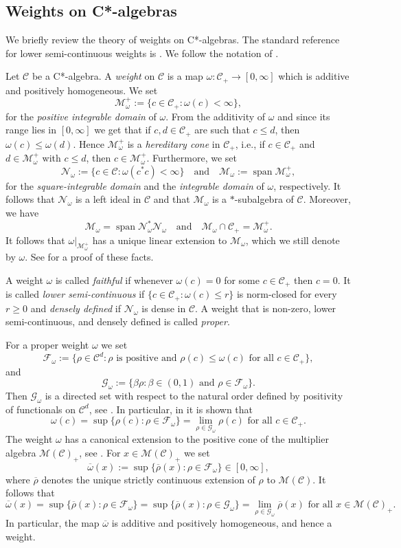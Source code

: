 \documentclass[11pt,final]{amsart}
\numberwithin{equation}{section}
\theoremstyle{plain}
\theoremstyle{definition}
\theoremstyle{remark}
\newcommand{\C}{{\mathcal{C}}}
\newcommand{\F}{{\mathcal{F}}}
\newcommand{\G}{{\mathcal{G}}}
\newcommand{\M}{{\mathcal{M}}}
\newcommand{\N}{{\mathcal{N}}}
\def\be{\beta}
\def\om{\omega}
\newcommand{\foral}{\text{ for all }}
\newcommand{\qand}{\quad\text{and}\quad}
\newcommand{\ol}{\overline}
\newcommand{\spn}{\operatorname{span}}
\begin{document}
\subsection{Weights on C*-algebras}

We briefly review the theory of weights on C*-algebras. The standard reference for lower semi-continuous weights is \cite{Com68}. We follow the notation of \cite{KV99}.

Let $\C$ be a C*-algebra.  A \emph{weight} on
$\C$ is a map $\om \colon \C_+\to[0,\infty]$ which is additive and positively
homogeneous.  
We set
\[
\M_\om^+ := \{c\in \C_+:\om(c)<\infty\},
\]
for the \emph{positive integrable domain} of $\om$.
From the additivity of $\om$ and since its range lies in $[0,\infty]$ we get that if $c,d\in \C_+$ are such that $c\leq d$, then $\om(c)\leq \om(d)$. Hence $\M_\om^+$ is a \emph{hereditary cone} in $\C_+$, i.e., if $c\in \C_+$ and $d\in \M_\om^+$ with $c\leq d$, then $c\in \M_\om^+$.
Furthermore, we set
\[
\N_\om := \{c\in \C:\om(c^*c)<\infty\}
\qand 
\M_\om:=\spn \M_{\om}^+,
\]
for the \emph{square-integrable domain} and the \emph{integrable domain} of $\om$, respectively.
It follows that $\N_\om$ is a left
ideal in $\C$ and that $\M_\om$ is a $*$-subalgebra of $\C$. Moreover, we have 
\[
\M_\om=\spn\N_\om^* \N_\om
\qand 
\M_\om\cap \C_+=\M_\om^+.
\]
It follows that $\om|_{\M_{\om}^+}$ has a unique
linear extension to $\M_\om$, which we still denote by $\om$. See \cite[Lemma~5.1.2]{Ped79} for a proof of these facts.

A weight $\om$ is called \emph{faithful} if whenever $\om(c)=0$ for some $c\in \C_+$ then $c=0$.  It is called \emph{lower semi-continuous} if
$\{c\in \C_+:\om(c)\leq r\}$ is norm-closed for every $r\geq 0$ and \emph{densely defined} if $\N_\om$ is dense in $\C$. A weight that is non-zero, lower semi-continuous, and densely defined is called \emph{proper}.

For a proper weight $\om$ we set 
\[
\F_\om:= \{ \rho \in \C^d: \rho \text{ is positive and } \rho(c) \leq \om(c) \foral c\in \C_+\},
\]
and
\[
\G_{\om}:= \{\be \rho : \be \in (0,1) \text{ and } \rho \in \F_{\om}\}.
\]
Then $\G_{\om}$ is a directed set with respect to the natural order defined by positivity of  functionals on $\C^d$, see \cite[Proposition 3.5]{Kus97A}.
In particular, in \cite[Proposition 1.7]{Com68} it is shown that 
\[
\om(c)= \sup\{ \rho(c) : \rho\in \F_\om\}=\lim_{\rho \in \G_\om} \rho(c) \foral c\in \C_+.
\]
The weight $\om$ has a canonical extension to the positive cone of the multiplier algebra $\M(\C)_+$, see  \cite[Discussion prior to Lemma~2.4]{Kus97A}.
For $x\in \M(\C)_+$ we set 
\[
\ol{\om}(x):= \sup\{ \ol{\rho} (x) : \rho\in \F_\om\} \in [0,\infty],
\]
where $\ol{\rho}$ denotes the unique strictly continuous extension of $\rho$ to $\M(\C)$. It follows that
\[
\ol{\om}(x)= \sup\{ \ol{\rho} (x) : \rho\in \F_\om\}= \sup\{ \ol{\rho} (x) : \rho\in \G_\om\}= \lim_{\rho \in \G_\om} \ol{\rho}(x) \foral x\in \M(\C)_+.
\]
In particular, the map $\ol{\om}$ is additive and positively homogeneous, and hence a weight.
\end{document}
